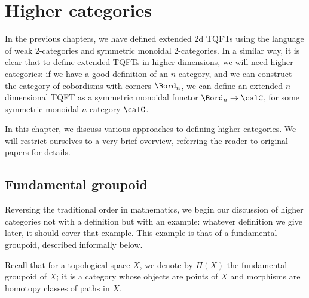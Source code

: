 \chapter{Higher categories}\label{c:higher-cat}

In the previous chapters, we have defined extended 2d TQFTs using
the language of weak 2-categories and symmetric monoidal 2-categories. In a
similar way, it is clear that to define extended TQFTs in higher
dimensions, we will need higher categories: if we have a good definition of
an $n$-category, and we can construct the category of cobordisms with
corners $\Bord_n$, we can define an extended $n$-dimensional TQFT as a
symmetric monoidal functor $\Bord_n\to \calC$, for some symmetric monoidal
$n$-category $\calC$.

In this chapter, we discuss various approaches to defining higher categories. We
will restrict ourselves to a very brief overview, referring the reader to
original papers for details.

\section{Fundamental groupoid}\label{s:fundamental-groupoid}

Reversing the traditional order in mathematics, we begin our discussion of
higher categories not with a definition but with an example: whatever definition
we give later, it should cover that example. This example is that of a
fundamental groupoid, described informally below.


Recall that for a topological space $X$, we denote by $\Pi(X)$ the fundamental
groupoid of $X$; it is a category whose objects are points of $X$ and morphisms
are homotopy classes of paths in $X$.

